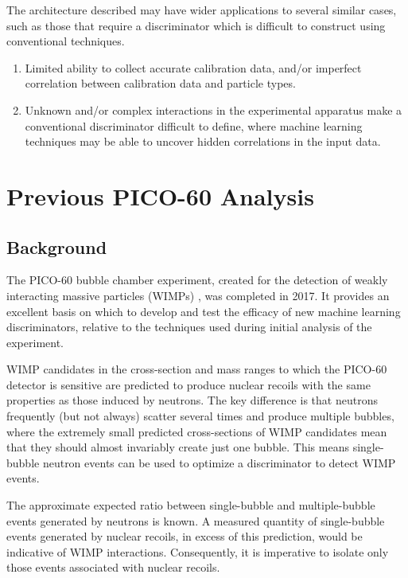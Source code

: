 \documentclass[10pt]{article}
\begin{document}
The architecture described may have wider applications to several similar cases, such as those that require a discriminator which is difficult to construct using conventional techniques.

\begin{enumerate}
    \item Limited ability to collect accurate calibration data, and/or imperfect correlation between calibration data and particle types.
    \item Unknown and/or complex interactions in the experimental apparatus make a conventional discriminator difficult to define, where machine learning techniques may be able to uncover hidden correlations in the input data.
\end{enumerate}

\section{Previous PICO-60 Analysis}

\subsection{Background}

The PICO-60 bubble chamber experiment, created for the detection of weakly interacting massive particles (WIMPs) \cite{pico}, was completed in 2017. It provides an excellent basis on which to develop and test the efficacy of new machine learning discriminators, relative to the techniques used during initial analysis of the experiment.

WIMP candidates in the cross-section and mass ranges to which the PICO-60 detector is sensitive are predicted to produce nuclear recoils with the same properties as those induced by neutrons. The key difference is that neutrons frequently (but not always) scatter several times and produce multiple bubbles, where the extremely small predicted cross-sections of WIMP candidates mean that they should almost invariably create just one bubble. This means single-bubble neutron events can be used to optimize a discriminator to detect WIMP events.

The approximate expected ratio between single-bubble and multiple-bubble events generated by neutrons is known. A measured quantity of single-bubble events generated by nuclear recoils, in excess of this prediction, would be indicative of WIMP interactions. Consequently, it is imperative to isolate only those events associated with nuclear recoils.
\end{document}
